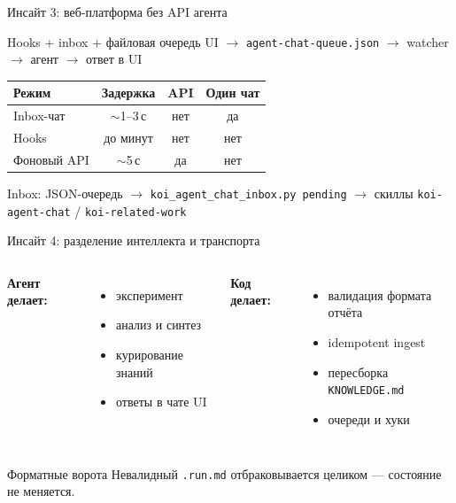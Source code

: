 \documentclass[aspectratio=169,11pt]{beamer}
\begin{document}
\begin{frame}{Инсайт 3: веб-платформа без API агента}
  \begin{block}{Hooks + inbox + файловая очередь}
    UI $\rightarrow$ \texttt{agent-chat-queue.json} $\rightarrow$ watcher $\rightarrow$ агент $\rightarrow$ ответ в UI
  \end{block}
  \begin{tabular}{lccc}
    \toprule
    Режим & Задержка & API & Один чат \\
    \midrule
    Inbox-чат & $\sim$1--3\,с & нет & да \\
    Hooks & до минут & нет & нет \\
    Фоновый API & $\sim$5\,с & да & нет \\
    \bottomrule
  \end{tabular}
  \vspace{0.5em}
  \small Inbox: JSON-очередь $\rightarrow$ \texttt{koi\_agent\_chat\_inbox.py pending} $\rightarrow$ скиллы \texttt{koi-agent-chat} / \texttt{koi-related-work}
\end{frame}

\begin{frame}{Инсайт 4: разделение интеллекта и транспорта}
  \begin{columns}[T]
    \textbf{Агент делает:}
    \begin{itemize}
      \item эксперимент
      \item анализ и синтез
      \item курирование знаний
      \item ответы в чате UI
    \end{itemize}
    \textbf{Код делает:}
    \begin{itemize}
      \item валидация формата отчёта
      \item idempotent ingest
      \item пересборка \texttt{KNOWLEDGE.md}
      \item очереди и хуки
    \end{itemize}
  \end{columns}
  \vspace{0.5em}
  \begin{alertblock}{Форматные ворота}
    Невалидный \texttt{.run.md} отбраковывается целиком --- состояние не меняется.
  \end{alertblock}
\end{frame}
\end{document}
